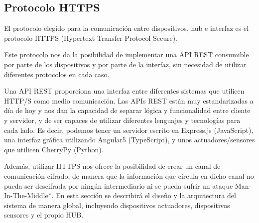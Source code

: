 \subsection{Protocolo HTTPS}
El protocolo elegido para la comunicación entre dispositivos, hub e interfaz es el protocolo HTTPS (Hypertext Transfer Protocol Secure).
\par
Este protocolo nos da la posibilidad de implementar una API REST consumible por parte de los dispositivos y por parte de la interfaz,
sin necesidad de utilizar diferentes protocolos en cada caso.
\par
Una API REST proporciona una interfaz entre diferentes sistemas que utilicen HTTP/S como medio comunicación. Las APIs REST están muy estandarizadas a día de hoy y nos dan la capacidad de separar lógica y funcionalidad entre cliente y servidor, y de ser capaces
de utilizar diferentes lenguajes y tecnologías para cada lado. Es decir, podemos tener un servidor escrito en Express.js (JavaScript), una interfaz 
gráfica utilizando Angular5 (TypeScript), y unos actuadores/sensores que utilicen CherryPy (Python).
\par
Además, utilizar HTTPS nos ofrece la posibilidad de crear un canal de comunicación cifrado, de manera que la información que circula en dicho 
canal no pueda ser descifrada por ningún intermediario ni se pueda sufrir un ataque Man-In-The-Middle*.
En esta sección se describirá el diseño y la arquitectura del sistema de manera global, incluyendo dispositivos actuadores, 
dispositivos sensores y el propio HUB.
